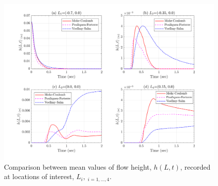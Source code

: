 \documentclass{article}
\begin{document}
\begin{figure}[H]
        \centering
        \includegraphics[width=1\textwidth]{InclinedPlane/LocalRecords/Records/H_mean.png}
        \caption{Comparison between mean values of flow height, $h(L,t)$, recorded at locations of interest, $L_i, \ _{i=1,...,4}$.}
        \label{fig:Ramp-LM-H-means}
\end{figure}
\end{document}
